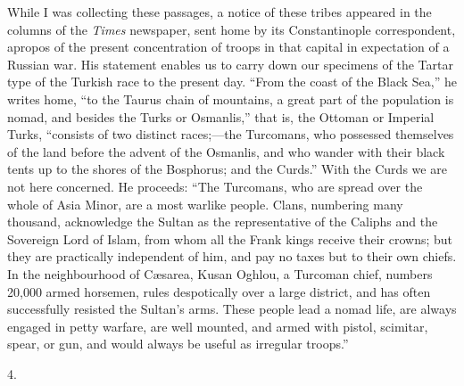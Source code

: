 While I was collecting these
passages, a notice of these tribes appeared in the columns of the \emph{Times}
newspaper, sent home by its Constantinople correspondent, apropos of
the present concentration of troops in that capital in expectation of
a Russian war. His statement enables us to carry down our specimens of
the Tartar type of the Turkish race to the present day. ``From the
coast of the Black Sea,'' he writes home, ``to the Taurus chain of
mountains, a great part of the population is nomad, and besides the
Turks or Osmanlis,'' that is, the Ottoman or Imperial Turks, ``consists
of two distinct races;—the Turcomans, who possessed themselves of the land before the advent of the Osmanlis, and who wander with
their black tents up to the shores of the Bosphorus; and the Curds.''
With the Curds we are not here concerned. He proceeds: ``The Turcomans,
who are spread over the whole of Asia Minor, are a most warlike
people. Clans, numbering many thousand, acknowledge the Sultan as the
representative of the Caliphs and the Sovereign Lord of Islam, from
whom all the Frank kings receive their crowns; but they are
practically independent of him, and pay no taxes but to their own
chiefs. In the neighbourhood of Cæsarea, Kusan Oghlou, a Turcoman
chief, numbers 20,000 armed horsemen, rules despotically over a large
district, and has often successfully resisted the Sultan's arms. These
people lead a nomad life, are always engaged in petty warfare, are
well mounted, and armed with pistol, scimitar, spear, or gun, and
would always be useful as irregular troops.''

4.


